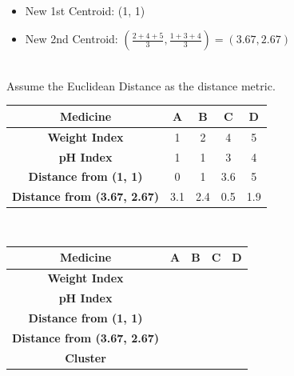 \documentclass{book}
\begin{document}
\\
\begin{itemize}
    \item New 1st Centroid: (1, 1)
    \item New 2nd Centroid: \((\frac{2+4+5}{3}, \frac{1+3+4}{3}) = (3.67, 2.67)\)
\end{itemize}
\\
Assume the Euclidean Distance as the distance metric.\\
\begin{center}
    \begin{tabular}{|c|c|c|c|c|}
        \hline
        \rowcolor{lightblue}
        \textbf{Medicine} & \textbf{A} & \textbf{B} & \textbf{C} & \textbf{D}\\
        \hline
        \textbf{Weight Index} & 1 & 2 & 4 & 5 \\
        \hline
        \textbf{pH Index} & 1 & 1 & 3 & 4 \\
        \hline
        \textbf{Distance from (1, 1)} & 0 & 1 & 3.6 & 5 \\
        \hline
        \textbf{Distance from (3.67, 2.67)} & 3.1 & 2.4 & 0.5 & 1.9 \\
        \hline
    \end{tabular}
\end{center}
\\
\begin{center}
    \begin{tabular}{|c|c|c|c|c|}
        \hline
        \rowcolor{lightblue}
        \textbf{Medicine} & \textbf{A} & \textbf{B} & \textbf{C} & \textbf{D}\\
        \hline
        \textbf{Weight Index} & \cellcolor{lightyellow}{1} & \cellcolor{lightyellow}{2} & \cellcolor{lightred}{4} & \cellcolor{lightred}{5} \\
        \hline
        \textbf{pH Index} & \cellcolor{lightyellow}{1} & \cellcolor{lightyellow}{1} & \cellcolor{lightred}{3} & \cellcolor{lightred}{4} \\
        \hline
        \textbf{Distance from (1, 1)} & \cellcolor{lightyellow}{0} & \cellcolor{lightyellow}{1} & \cellcolor{lightred}{3.6} & \cellcolor{lightred}{5} \\
        \hline
        \textbf{Distance from (3.67, 2.67)} & \cellcolor{lightyellow}{3.1} & \cellcolor{lightyellow}{2.4} & \cellcolor{lightred}{0.5} & \cellcolor{lightred}{1.9} \\
        \hline
        \textbf{Cluster} & \cellcolor{lightyellow}{1} & \cellcolor{lightyellow}{1} & \cellcolor{lightred}{2} & \cellcolor{lightred}{2} \\
        \hline
    \end{tabular}
\end{center}
\end{document}
